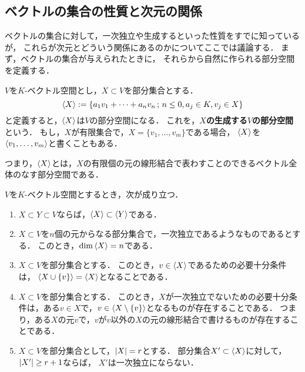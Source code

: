\subsection{ベクトルの集合の性質と次元の関係}
ベクトルの集合に対して，一次独立や生成するといった性質をすでに知っているが，
これらが次元とどういう関係にあるのかについてここでは議論する．
まず，ベクトルの集合が与えられたときに，
それらから自然に作られる部分空間を定義する．
\begin{dfn}
  $V$を$K$-ベクトル空間とし，$X \subset V$を部分集合とする．
  \begin{equation}
    \left\langle X \right\rangle := \{ a_1 v_1 + \dots + a_n v_n \,;\, n \le 0, a_j \in K, v_j \in X \}
  \end{equation}
  と定義すると，$\left\langle X \right\rangle$は$V$の部分空間になる．
  これを，\textbf{$X$の生成する$V$の部分空間}という．
  もし，$X$が有限集合で，$X = \{v_1,\dots,v_m\}$である場合，
  $\left\langle X \right\rangle$を$\left\langle v_1,\dots,v_m \right\rangle$と書くこともある．
\end{dfn}
つまり，$\left\langle X \right\rangle$とは，$X$の有限個の元の線形結合で表わすことのできるベクトル全体のなす部分空間である．
\begin{prop}\label{prop:gen_property}
  $V$を$K$-ベクトル空間とするとき，次が成り立つ．
  \begin{enumerate}
    \item $X \subset Y \subset V$ならば，$\left\langle X \right\rangle \subset \left\langle Y \right\rangle$である．
    \item $X \subset V$を$n$個の元からなる部分集合で，一次独立であるようなものであるとする．
    このとき，$\dim \left\langle X \right\rangle = n$である．
    \item $X \subset V$を部分集合とする．
    このとき，$v \in \left\langle X \right\rangle$であるための必要十分条件は，
    $\left\langle X \cup \{v\} \right\rangle = \left\langle X \right\rangle$となることである．
    \item $X \subset V$を部分集合とする．
    このとき，$X$が一次独立でないための必要十分条件は，ある$v \in X$で，$v \in \left\langle X \setminus \{v\} \right\rangle$となるものが存在することである．
    つまり，ある$X$の元$v$で，$v$が$v$以外の$X$の元の線形結合で書けるものが存在することである．
    \item $X \subset V$を部分集合として，$\left|X\right|=r$とする．
    部分集合$X' \subset \left\langle X \right\rangle$に対して，
    $\left|X'\right|\ge r+1$ならば，
    $X'$は一次独立にならない．
  \end{enumerate}
\end{prop}
